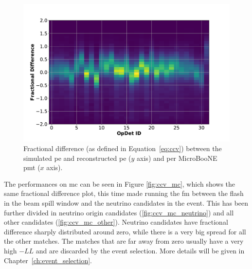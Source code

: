 \begin{figure}[]
\centering
\includegraphics[width=.70\textwidth]{images/FlashMatching/ccv_remapped_pandoraCosmic_simpleFlashBeam_acpt}
\caption[PMT PE Fraction Difference Between Data and Simulation]{Fractional difference (as defined in Equation~\ref{eq:ccv}) between the simulated \acrshort{pe} and reconstructed \acrshort{pe} ($y$ axis) and per MicroBooNE \acrshort{pmt} ($x$ axis).}
\label{fig:ccv}
\end{figure}



The performances on \acrshort{mc} can be seen in Figure \ref{fig:ccv_mc}, which shows the same fractional difference plot, this time made running the \acrshort{fm} between the flash in the beam spill window and the neutrino candidates in the event. This has been further divided in neutrino origin candidates (\ref{fig:ccv_mc_neutrino}) and all other candidates (\ref{fig:ccv_mc_other}). Neutrino candidates have fractional difference sharply distributed around zero, while there is a very big spread for all the other matches. The matches that are far away from zero usually have a very high $-LL$ and are discarded by the event selection. More details will be given in Chapter~\ref{ch:event_selection}.


